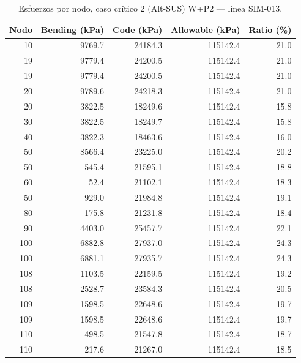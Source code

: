 \begin{table}[htbp]
  \centering
  \footnotesize
  \caption{Esfuerzos por nodo, caso crítico 2 (Alt-SUS) W+P2 — línea SIM-013.}
  \label{tab:esfuerzos-critico}
  \begin{tabular}{rrrrr}
    \toprule
    Nodo & Bending (\si{kPa}) & Code (\si{kPa}) & Allowable (\si{kPa}) & Ratio (\%) \\
    \midrule
    10 & \num{9769.7} & \num{24184.3} & \num{115142.4} & 21.0 \\
    19 & \num{9779.4} & \num{24200.5} & \num{115142.4} & 21.0 \\
    19 & \num{9779.4} & \num{24200.5} & \num{115142.4} & 21.0 \\
    20 & \num{9789.6} & \num{24218.3} & \num{115142.4} & 21.0 \\
    20 & \num{3822.5} & \num{18249.6} & \num{115142.4} & 15.8 \\
    30 & \num{3822.5} & \num{18249.7} & \num{115142.4} & 15.8 \\
    40 & \num{3822.3} & \num{18463.6} & \num{115142.4} & 16.0 \\
    50 & \num{8566.4} & \num{23225.0} & \num{115142.4} & 20.2 \\
    50 & \num{545.4} & \num{21595.1} & \num{115142.4} & 18.8 \\
    60 & \num{52.4} & \num{21102.1} & \num{115142.4} & 18.3 \\
    50 & \num{929.0} & \num{21984.8} & \num{115142.4} & 19.1 \\
    80 & \num{175.8} & \num{21231.8} & \num{115142.4} & 18.4 \\
    90 & \num{4403.0} & \num{25457.7} & \num{115142.4} & 22.1 \\
    100 & \num{6882.8} & \num{27937.0} & \num{115142.4} & 24.3 \\
    100 & \num{6881.1} & \num{27935.7} & \num{115142.4} & 24.3 \\
    108 & \num{1103.5} & \num{22159.5} & \num{115142.4} & 19.2 \\
    108 & \num{2528.7} & \num{23584.3} & \num{115142.4} & 20.5 \\
    109 & \num{1598.5} & \num{22648.6} & \num{115142.4} & 19.7 \\
    109 & \num{1598.5} & \num{22648.6} & \num{115142.4} & 19.7 \\
    110 & \num{498.5} & \num{21547.8} & \num{115142.4} & 18.7 \\
    110 & \num{217.6} & \num{21267.0} & \num{115142.4} & 18.5 \\

\end{tabular}
\end{table}
